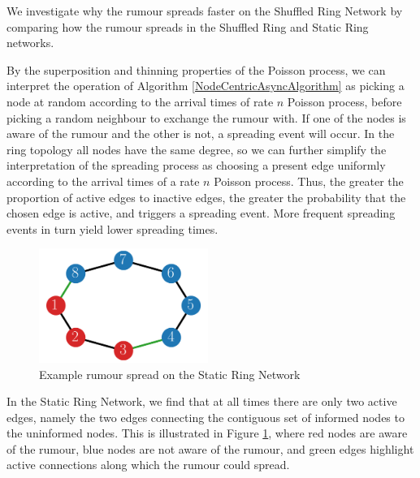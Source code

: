 We investigate why the rumour spreads faster on the Shuffled Ring Network by comparing how the rumour spreads in the Shuffled Ring and Static Ring networks.

By the superposition and thinning properties of the Poisson process, we can interpret the operation of Algorithm \ref{NodeCentricAsyncAlgorithm} as picking a node at random according to the arrival times of rate $n$ Poisson process,
before picking a random neighbour to exchange the rumour with. If one of the nodes is aware of the rumour and the other is not, a spreading event will occur.
In the ring topology all nodes have the same degree, so we can further simplify the interpretation of the spreading process as choosing a present edge uniformly according to the arrival times of a rate $n$ Poisson process. Thus, the greater the proportion of active edges to inactive edges, the greater the probability that the chosen edge is active, and triggers a spreading event. More frequent spreading events in turn yield lower spreading times. 

\begin{figure}[h]
	\centering
	\includegraphics[width=0.49\textwidth]{./figures/static_ring_example_spread.png}
	\caption{Example rumour spread on the Static Ring Network}
	\label{fig:staticRingExampleSpread}
\end{figure}

In the Static Ring Network, we find that at all times there are only two active edges, namely the two edges connecting the contiguous set of informed nodes to the uninformed nodes.  This is illustrated in Figure \ref{fig:staticRingExampleSpread}, where red nodes are aware of the rumour, blue nodes are not aware of the rumour, and green edges highlight active connections along which the rumour could spread.

